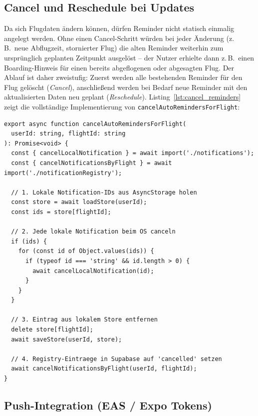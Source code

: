\subsection{Cancel und Reschedule bei Updates}
\label{subsec:cancel-reschedule}

Da sich Flugdaten ändern können, dürfen Reminder nicht statisch einmalig angelegt werden.
Ohne einen Cancel-Schritt würden bei jeder Änderung (z.\,B.\ neue Abflugzeit, stornierter Flug)
die alten Reminder weiterhin zum ursprünglich geplanten Zeitpunkt ausgelöst -- der Nutzer
erhielte dann z.\,B.\ einen Boarding-Hinweis für einen bereits abgeflogenen oder
abgesagten Flug.
Der Ablauf ist daher zweistufig: Zuerst werden alle bestehenden Reminder für den Flug
gelöscht (\emph{Cancel}), anschließend werden bei Bedarf neue Reminder mit den
aktualisierten Daten neu geplant (\emph{Reschedule}).
Listing~\ref{lst:cancel_reminders} zeigt die vollständige Implementierung von
\texttt{cancelAutoRemindersForFlight}:

\begin{lstlisting}[style=skyline-ts,
  caption={Vollstaendiges cancelAutoRemindersForFlight
           (services/flightAutoReminderService.ts)},
  label={lst:cancel_reminders}]
export async function cancelAutoRemindersForFlight(
  userId: string, flightId: string
): Promise<void> {
  const { cancelLocalNotification } = await import('./notifications');
  const { cancelNotificationsByFlight } = await import('./notificationRegistry');

  // 1. Lokale Notification-IDs aus AsyncStorage holen
  const store = await loadStore(userId);
  const ids = store[flightId];

  // 2. Jede lokale Notification beim OS canceln
  if (ids) {
    for (const id of Object.values(ids)) {
      if (typeof id === 'string' && id.length > 0) {
        await cancelLocalNotification(id);
      }
    }
  }

  // 3. Eintrag aus lokalem Store entfernen
  delete store[flightId];
  await saveStore(userId, store);

  // 4. Registry-Eintraege in Supabase auf 'cancelled' setzen
  await cancelNotificationsByFlight(userId, flightId);
}
\end{lstlisting}

\subsection{Push-Integration (EAS / Expo Tokens)}
\label{subsec:push}

